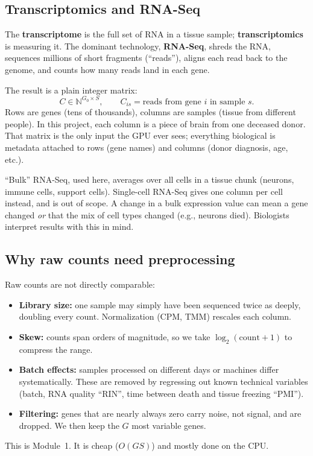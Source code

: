 \documentclass[11pt]{article}
\begin{document}
\subsection{Transcriptomics and RNA-Seq}

The \textbf{transcriptome} is the full set of RNA in a tissue sample;
\textbf{transcriptomics} is measuring it. The dominant technology,
\textbf{RNA-Seq}, shreds the RNA, sequences millions of short fragments
(``reads''), aligns each read back to the genome, and counts how many reads
land in each gene.

The result is a plain integer matrix:
\[
C \in \mathbb{N}^{G_0\times S}, \qquad C_{is} = \text{reads from gene } i
\text{ in sample } s.
\]
Rows are genes (tens of thousands), columns are samples (tissue from different
people). In this project, each column is a piece of brain from one deceased
donor. That matrix is the only input the GPU ever sees; everything biological
is metadata attached to rows (gene names) and columns (donor diagnosis, age,
etc.).

\begin{pitfall}
``Bulk'' RNA-Seq, used here, averages over all cells in a tissue chunk
(neurons, immune cells, support cells). Single-cell RNA-Seq gives one column
per cell instead, and is out of scope. A change in a bulk expression value can
mean a gene changed \emph{or} that the mix of cell types changed (e.g., neurons
died). Biologists interpret results with this in mind.
\end{pitfall}

\subsection{Why raw counts need preprocessing}

Raw counts are not directly comparable:
\begin{itemize}[nosep]
  \item \textbf{Library size:} one sample may simply have been sequenced
        twice as deeply, doubling every count. Normalization (CPM, TMM)
        rescales each column.
  \item \textbf{Skew:} counts span orders of magnitude, so we take
        $\log_2(\text{count}+1)$ to compress the range.
  \item \textbf{Batch effects:} samples processed on different days or
        machines differ systematically. These are removed by regressing out
        known technical variables (batch, RNA quality ``RIN'', time between
        death and tissue freezing ``PMI'').
  \item \textbf{Filtering:} genes that are nearly always zero carry noise, not
        signal, and are dropped. We then keep the $G$ most variable genes.
\end{itemize}
This is Module~1. It is cheap ($O(GS)$) and mostly done on the CPU.
\end{document}
